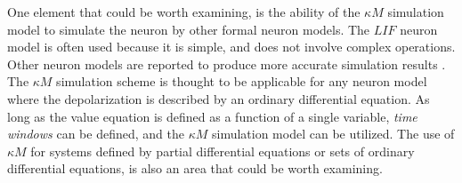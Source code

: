 	One element that could be worth examining, is the ability of the $\kappa M$ simulation model to simulate the neuron by other formal neuron models.
	The $LIF$ neuron model is often used because it is simple, and does not involve complex operations.
	Other neuron models are reported to produce more accurate simulation results \cite{gerstnerKistler2002}. %
	The $\kappa M$ simulation scheme is thought to be applicable for any neuron model where the depolarization is described by an ordinary differential equation.
	As long as the value equation is defined as a function of a single variable, \emph{time windows} can be defined, and the $\kappa M$ simulation model can be utilized.
	The use of $\kappa M$ for systems defined by partial differential equations or sets of ordinary differential equations, is also an area that could be worth examining.

